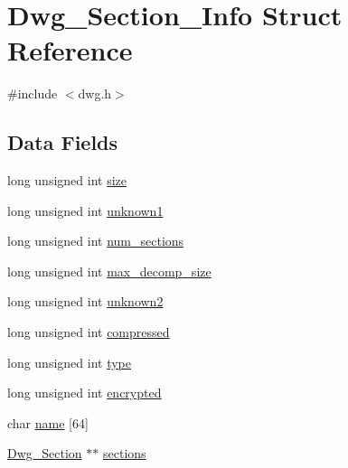 \hypertarget{structDwg__Section__Info}{\section{\-Dwg\-\_\-\-Section\-\_\-\-Info \-Struct \-Reference}
\label{structDwg__Section__Info}
}


{\ttfamily \#include $<$dwg.\-h$>$}

\subsection*{\-Data \-Fields}
\begin{DoxyCompactItemize}
\item 
long unsigned int \hyperlink{structDwg__Section__Info_a88f81e2e179311833a5e459dba0e63d3}{size}
\item 
long unsigned int \hyperlink{structDwg__Section__Info_a74cc3120cecd3f3b3232c70c779630eb}{unknown1}
\item 
long unsigned int \hyperlink{structDwg__Section__Info_a1ecc7dd7d5c6d7ba2935be2808cbaea4}{num\-\_\-sections}
\item 
long unsigned int \hyperlink{structDwg__Section__Info_ac5c15e3970ac4e600abdbe9b48214b6d}{max\-\_\-decomp\-\_\-size}
\item 
long unsigned int \hyperlink{structDwg__Section__Info_aada4b88f2cab401b11aacebfa8d53b4e}{unknown2}
\item 
long unsigned int \hyperlink{structDwg__Section__Info_a982e0a42745bcae558af3ab3cfe9cf58}{compressed}
\item 
long unsigned int \hyperlink{structDwg__Section__Info_aed88b6d08e99694e72ce8e050c75de1b}{type}
\item 
long unsigned int \hyperlink{structDwg__Section__Info_afd772338987a356893cf012bca6ed2c3}{encrypted}
\item 
char \hyperlink{structDwg__Section__Info_aea3f32d599a506f82b66254945f234a8}{name} \mbox{[}64\mbox{]}
\item 
\hyperlink{dwg_8h_a866c3e57d707d1f038f00d83684cb229}{\-Dwg\-\_\-\-Section} $\ast$$\ast$ \hyperlink{structDwg__Section__Info_a5657b836eb9d6b6b3b19e452c3947809}{sections}
\end{DoxyCompactItemize}


